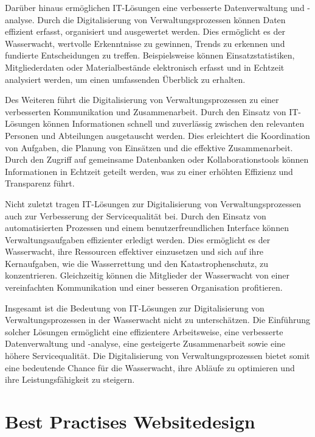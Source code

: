 \documentclass[fontsize=12pt,openright,oneside,paper=a4,BCOR=1cm]{scrbook}
\begin{document}
Darüber hinaus ermöglichen IT-Lösungen eine verbesserte Datenverwaltung und -analyse. Durch die Digitalisierung von Verwaltungsprozessen können Daten effizient erfasst, organisiert und ausgewertet werden. Dies ermöglicht es der Wasserwacht, wertvolle Erkenntnisse zu gewinnen, Trends zu erkennen und fundierte Entscheidungen zu treffen. Beispielsweise können Einsatzstatistiken, Mitgliederdaten oder Materialbestände elektronisch erfasst und in Echtzeit analysiert werden, um einen umfassenden Überblick zu erhalten.

Des Weiteren führt die Digitalisierung von Verwaltungsprozessen zu einer verbesserten Kommunikation und Zusammenarbeit. Durch den Einsatz von IT-Lösungen können Informationen schnell und zuverlässig zwischen den relevanten Personen und Abteilungen ausgetauscht werden. Dies erleichtert die Koordination von Aufgaben, die Planung von Einsätzen und die effektive Zusammenarbeit. Durch den Zugriff auf gemeinsame Datenbanken oder Kollaborationstools können Informationen in Echtzeit geteilt werden, was zu einer erhöhten Effizienz und Transparenz führt.

Nicht zuletzt tragen IT-Lösungen zur Digitalisierung von Verwaltungsprozessen auch zur Verbesserung der Servicequalität bei. Durch den Einsatz von automatisierten Prozessen und einem benutzerfreundlichen Interface können Verwaltungsaufgaben effizienter erledigt werden. Dies ermöglicht es der Wasserwacht, ihre Ressourcen effektiver einzusetzen und sich auf ihre Kernaufgaben, wie die Wasserrettung und den Katastrophenschutz, zu konzentrieren. Gleichzeitig können die Mitglieder der Wasserwacht von einer vereinfachten Kommunikation und einer besseren Organisation profitieren.

Insgesamt ist die Bedeutung von IT-Lösungen zur Digitalisierung von Verwaltungsprozessen in der Wasserwacht nicht zu unterschätzen. Die Einführung solcher Lösungen ermöglicht eine effizientere Arbeitsweise, eine verbesserte Datenverwaltung und -analyse, eine gesteigerte Zusammenarbeit sowie eine höhere Servicequalität. Die Digitalisierung von Verwaltungsprozessen bietet somit eine bedeutende Chance für die Wasserwacht, ihre Abläufe zu optimieren und ihre Leistungsfähigkeit zu steigern.

\section{Best Practises Websitedesign}

\end{document}
